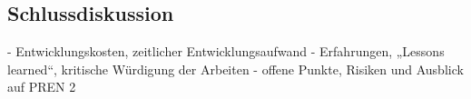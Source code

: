 \documentclass[../../main.tex]{subfiles}
\begin{document}
\subsection{Schlussdiskussion}

- Entwicklungskosten, zeitlicher Entwicklungsaufwand
- Erfahrungen, „Lessons learned“, kritische Würdigung der Arbeiten
- offene Punkte, Risiken und Ausblick auf PREN 2
\end{document}
